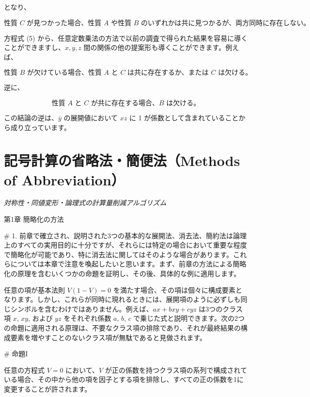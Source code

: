 \documentclass[a4paper,11pt,openany]{ltjsbook}
\begin{document}
となり、

\[
\text{性質 $C$ が見つかった場合、性質 $A$ や性質 $B$ のいずれかは共に見つかるが、両方同時に存在しない。}
\]

方程式 (5) から、任意定数乗法の方法で以前の調査で得られた結果を容易に導くことができますし、$x, y, z$ 間の関係の他の提案形も導くことができます。例えば、

\[
\text{性質 $B$ が欠けている場合、性質 $A$ と $C$ は共に存在するか、または $C$ は欠ける。}
\]

逆に、

\[
\text{性質 $A$ と $C$ が共に存在する場合、$B$ は欠ける。}
\]

この結論の逆は、$\bar{y}$ の展開値において $xz$ に 1 が係数として含まれていることから成り立っています。

\newpage

\chapter{記号計算の省略法・簡便法（Methods of Abbreviation）}
\label{ch:ix}

\begin{center}
\large\textit{対称性・同値変形・論理式の計算量削減アルゴリズム}
\end{center}
\vspace{4mm}

第1章 簡略化の方法

\# 1. 前章で確立され、説明された3つの基本的な展開法、消去法、簡約法は論理上のすべての実用目的に十分ですが、それらには特定の場合において重要な程度で簡略化が可能であり、特に消去法に関してはそのような場合があります。これらについては本章で注意を喚起したいと思います。まず、前章の方法による簡略化の原理を含むいくつかの命題を証明し、その後、具体的な例に適用します。

任意の項が基本法則 \( V(1-V) = 0 \) を満たす場合、その項は個々に構成要素となります。しかし、これらが同時に現れるときには、展開項のように必ずしも同じシンボルを含むわけではありません。例えば、\( ax + bxy + cyz \) は3つのクラス項 \( x \), \( xy \), および \( yz \) をそれぞれ係数 \( a \), \( b \), \( c \) で乗じた式と説明できます。次の2つの命題に適用される原理は、不要なクラス項の排除であり、それが最終結果の構成要素を増やすことのないクラス項が無駄であると見做されます。

\# 命題I

任意の方程式 \( V = 0 \) において、\( V \) が正の係数を持つクラス項の系列で構成されている場合、その中から他の項を因子とする項を排除し、すべての正の係数を1に変更することが許されます。
\end{document}
